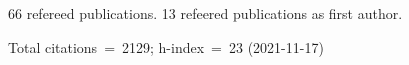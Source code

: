 66 refereed publications. 13 refeered publications as first author.

Total citations~=~2129; h-index~=~23 (2021-11-17)